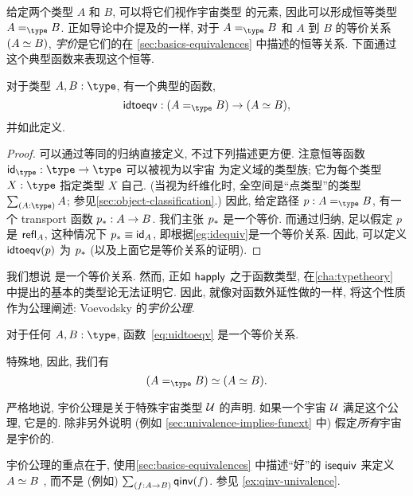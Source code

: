 %
%
给定两个类型 $A$ 和 $B$, 可以将它们视作宇宙类型 \type 的元素, 因此可以形成恒等类型 $\id[\type]AB$.
正如导论中介提及的一样, 对于 $\id[\type]AB$ 和 $A$ 到 $B$ 的等价关系 $(\eqv AB)$, \emph{宇价}是它们的在 \cref{sec:basics-equivalences} 中描述的恒等关系.
下面通过这个典型函数来表现这个恒等.

\begin{lem}\label{thm:idtoeqv}
  对于类型 $A,B:\type$, 有一个典型的函数,
  \begin{equation}\label{eq:uidtoeqv}
    \idtoeqv : (\id[\type]AB) \to (\eqv A B),
  \end{equation}
  并如此定义.
\end{lem}
\begin{proof}
  可以通过等同的归纳直接定义, 不过下列描述更方便.
  注意恒等函数 $\idfunc[\type]:\type\to\type$ 可以被视为以宇宙 \type 为定义域的类型族; 它为每个类型 $X:\type$ 指定类型 $X$ 自己.
  (当视为纤维化时, 全空间是``点类型''的类型 $\sm{A:\type}A$; 参见\cref{sec:object-classification}.)
  因此, 给定路径 $p:A =_\type B$, 有一个 transport 函数 $\transf{p}:A \to B$.
  我们主张 $\transf{p}$ 是一个等价.
  而通过归纳, 足以假定 $p$ 是 $\refl A$, 这种情况下 $\transf{p} \jdeq \idfunc[A]$, 即根据\cref{eg:idequiv}是一个等价关系.
  因此, 可以定义 $\idtoeqv(p)$ 为 $\transf{p}$ (以及上面它是等价关系的证明).
\end{proof}

我们想说 \idtoeqv 是一个等价关系.
然而, 正如 $\happly$ 之于函数类型, 在\cref{cha:typetheory} 中提出的基本的类型论无法证明它.
因此, 就像对函数外延性做的一样, 将这个性质作为公理阐述: Voevodsky 的\emph{宇价公理}.

\begin{axiom}[Univalence]\label{axiom:univalence}
  对于任何 $A,B:\type$, 函数~\eqref{eq:uidtoeqv} 是一个等价关系.
\end{axiom}

特殊地, 因此, 我们有
  \[
\eqv{(\id[\type]{A}{B})}{(\eqv A B)}.
\]

严格地说, 宇价公理是关于特殊宇宙类型 $\UU$ 的声明.
如果一个宇宙 $\UU$ 满足这个公理, 它是的.
%
%
除非另外说明 (例如 \cref{sec:univalence-implies-funext} 中) 假定\emph{所有}宇宙是宇价的.

\begin{rmk}
  宇价公理的重点在于, 使用\cref{sec:basics-equivalences} 中描述``好''的 $\isequiv$ 来定义 $\eqv AB$ , 而不是 (例如) $\sm{f:A\to B} \qinv(f)$.
  参见 \cref{ex:qinv-univalence}.
\end{rmk}

